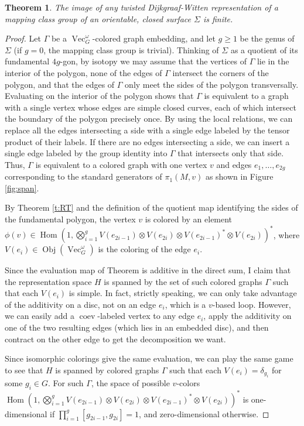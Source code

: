 \documentclass{amsart}
\newtheorem{thm}{Theorem}[section]
\DeclareMathOperator{\Vect}{Vec}
\DeclareMathOperator{\Hom}{Hom}
\DeclareMathOperator{\Obj}{Obj}
\DeclareMathOperator{\coev}{coev}
\newcommand{\one}{1}
\newcommand{\Si}{\Sigma}
\begin{document}
\begin{thm}\label{thm:closed}
The image of any twisted Dijkgraaf-Witten representation of a mapping class group of an orientable, closed surface $\Si$ is finite.
\end{thm}

\begin{proof}
Let $\Gamma$ be a $\Vect_G^\omega$-colored graph embedding, and let $g \ge 1$ be the genus of $\Si$ (if $g = 0$, the mapping class group is trivial). Thinking of $\Si$ as a quotient of its fundamental $4g$-gon, by isotopy we may assume that the vertices of $\Gamma$ lie in the interior of the polygon, none of the edges of $\Gamma$ intersect the corners of the polygon, and that the edges of $\Gamma$ only meet the sides of the polygon transversally.  Evaluating on the interior of the polygon shows that $\Gamma$ is equivalent to a graph with a single vertex whose edges are simple closed curves, each of which intersect the boundary of the polygon precisely once.  By using the local relations, we can replace all the edges intersecting a side with a single edge labeled by the tensor product of their labels.  If there are no edges intersecting a side, we can insert a single edge labeled by the group identity into $\Gamma$ that intersects only that side.  Thus, $\Gamma$ is equivalent to a colored graph with one vertex $v$ and edges $e_1, \ldots, e_{2g}$ corresponding to the standard generators of $\pi_1(M,v)$ as shown in Figure \ref{fig:span}.

By Theorem \ref{t:RT} and the definition of the quotient map identifying the sides of the fundamental polygon, the vertex $v$ is colored by an element $\phi(v) \in \Hom (\one, \bigotimes_{i=1}^g V(e_{2i-1}) \otimes V(e_{2i})  \otimes V(e_{2i-1})^* \otimes V(e_{2i}))^*$, where $V(e_i) \in \Obj(\Vect_G^\omega)$ is the coloring of the edge $e_i$.   

Since the evaluation map of Theorem \label{t:RT} is additive in the direct sum, I claim that the representation space $H$ is spanned by the set of such colored graphs $\Gamma$ such that each $V(e_i)$ is simple.   In fact, strictly speaking, we can only take advantage of the additivity on a disc, not on an edge $e_i$, which is a $v$-based loop. However, we can easily add a $\coev$-labeled vertex to any edge $e_i$, apply the additivity on one of the two resulting edges (which lies in an embedded disc), and then contract on the other edge to get the decomposition we want.

Since isomorphic colorings give the same evaluation, we can play the same game to see that $H$ is spanned by colored graphs $\Gamma$ such that
each $V(e_i) = \delta_{g_i}$ for some $g_i \in G$.  For such $\Gamma$,  the space of possible $v$-colors $\Hom (\one, \bigotimes_{i=1}^g V(e_{2i-1}) \otimes V(e_{2i})  \otimes V(e_{2i-1})^* \otimes V(e_{2i}))^*$ is one-dimensional if $\prod_{i=1}^g [g_{2i-1}, g_{2i}] = 1$, and zero-dimensional otherwise.


\end{proof}
\end{document}
